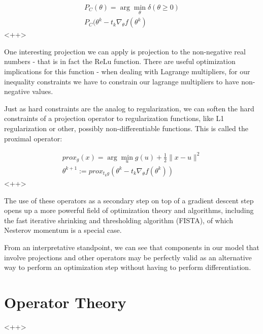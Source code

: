 \documentclass[a4paper]{article}
\begin{document}
\begin{equation}
  \begin{split}
    P_C(\theta) = \arg \min_{\theta} \delta \left( \theta \ge 0 \right) \\
    P_C(\theta^k - t_k \nabla_{\theta} f(\theta^k)
  \end{split}
  \label{<++>}
\end{equation}<++>

One interesting projection we can apply is projection to the non-negative real numbers - that is in fact the ReLu function. 
There are useful optimization implications for this function - when dealing with Lagrange multipliers, for our inequality constraints we have to constrain our lagrange multipliers to have non-negative values. 

Just as hard constraints are the analog to regularization, we can soften the hard constraints of a projection operator to regularization functions, like L1 regularization or other, possibly non-differentiable functions. 
This is called the proximal operator:

\begin{equation}
  \begin{split}
    prox_g(x) = \arg \min_{u} g(u) + \frac{1}{2} \lVert x - u \rVert ^2\\
    \theta^{k+1} := prox_{t_k g} \left( \theta^k - t_k \nabla_{\theta} f(\theta^k) \right)
  \end{split}
  \label{<++>}
\end{equation}<++>

The use of these operators as a secondary step on top of a gradient descent step opens up a more powerful field of optimization theory and algorithms, including the fast iterative shrinking and thresholding algorithm (FISTA), of which Nesterov momentum is a special case. 

From an interpretative standpoint, we can see that components in our model that involve projections and other operators may be perfectly valid as an alternative way to perform an optimization step without having to perform differentiation. 

\section{Operator Theory}<++>
\end{document}
